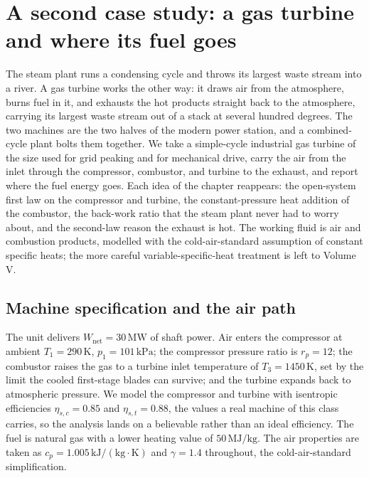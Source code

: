 





\section{A second case study: a gas turbine and where its fuel goes}

The steam plant runs a condensing cycle and throws its largest waste
stream into a river. A gas turbine works the other way: it draws air from
the atmosphere, burns fuel in it, and exhausts the hot products straight
back to the atmosphere, carrying its largest waste stream out of a stack
at several hundred degrees. The two machines are the two halves of the
modern power station, and a combined-cycle plant bolts them together. We
take a simple-cycle industrial gas turbine of the size used for grid
peaking and for mechanical drive, carry the air from the inlet through
the compressor, combustor, and turbine to the exhaust, and report where
the fuel energy goes. Each idea of the chapter reappears: the
open-system first law on the compressor and turbine, the
constant-pressure heat addition of the combustor, the back-work ratio
that the steam plant never had to worry about, and the second-law reason
the exhaust is hot. The working fluid is air and combustion products,
modelled with the cold-air-standard assumption of constant specific
heats; the more careful variable-specific-heat treatment is left to
Volume V.

\subsection{Machine specification and the air path}

The unit delivers $W_{\text{net}} = 30\,\text{MW}$ of shaft power. Air
enters the compressor at ambient $T_1 = 290\,\si{\kelvin}$,
$p_1 = 101\,\text{kPa}$; the compressor pressure ratio is $r_p = 12$; the
combustor raises the gas to a turbine inlet temperature of
$T_3 = 1450\,\si{\kelvin}$, set by the limit the cooled first-stage
blades can survive; and the turbine expands back to atmospheric pressure.
We model the compressor and turbine with isentropic efficiencies
$\eta_{s,c} = 0.85$ and $\eta_{s,t} = 0.88$, the values a real machine of
this class carries, so the analysis lands on a believable rather than an
ideal efficiency. The fuel is natural gas with a lower heating value of
$50\,\text{MJ}/\text{kg}$. The air properties are taken as
$c_p = 1.005\,\text{kJ}/(\text{kg}\cdot\si{\kelvin})$ and $\gamma = 1.4$
throughout, the cold-air-standard simplification.

